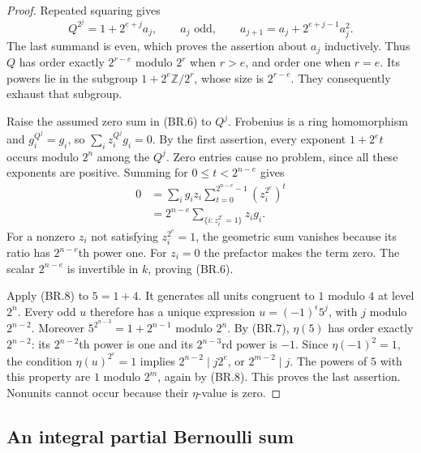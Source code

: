 \begin{proof}
Repeated squaring gives
\[
 Q^{2^j}=1+2^{e+j}a_j,\qquad a_j\text{ odd},\qquad
 a_{j+1}=a_j+2^{e+j-1}a_j^2.
 \tag{BR.8}
\]
The last summand is even, which proves the assertion about $a_j$
inductively.  Thus $Q$ has order exactly $2^{r-e}$ modulo $2^r$
when $r>e$, and order one when $r=e$.  Its powers lie in the
subgroup $1+2^e\mathbb Z/2^r$, whose size is $2^{r-e}$.
They consequently exhaust that subgroup.

Raise the assumed zero sum in (BR.6) to $Q^j$.  Frobenius is a
ring homomorphism and $g_i^{Q^j}=g_i$, so
$\sum_i z_i^{Q^j}g_i=0$.  By the first assertion, every exponent
$1+2^e t$ occurs modulo $2^n$ among the $Q^j$.  Zero entries cause
no problem, since all these exponents are positive.  Summing for
$0\le t<2^{n-e}$ gives
\[
 \begin{split}
 0&=\sum_i g_i z_i
       \sum_{t=0}^{2^{n-e}-1}(z_i^{2^e})^t\\
  &=2^{n-e}\sum_{\{i:z_i^{2^e}=1\}}z_i g_i.
 \end{split}
 \tag{BR.9}
\]
For a nonzero $z_i$ not satisfying $z_i^{2^e}=1$, the geometric
sum vanishes because its ratio has $2^{n-e}$th power one.
For $z_i=0$ the prefactor makes the term zero.  The scalar
$2^{n-e}$ is invertible in $k$, proving (BR.6).

Apply (BR.8) to $5=1+4$.
It generates all units congruent to $1$ modulo $4$ at level $2^n$.
Every odd $u$ therefore has a unique expression
$u=(-1)^\epsilon5^j$, with $j$ modulo $2^{n-2}$.
Moreover
$5^{2^{n-3}}=1+2^{n-1}$ modulo $2^n$.
By (BR.7), $\eta(5)$ has order exactly $2^{n-2}$:
its $2^{n-2}$th power is one and its $2^{n-3}$rd power is $-1$.
Since $\eta(-1)^2=1$, the condition
$\eta(u)^{2^e}=1$ implies
$2^{n-2}\mid j2^e$, or $2^{m-2}\mid j$.
The powers of $5$ with this property are $1$ modulo $2^m$,
again by (BR.8).  This proves the last assertion.
Nonunits cannot occur because their $\eta$-value is zero.
\end{proof}

\subsection{An integral partial Bernoulli sum}

